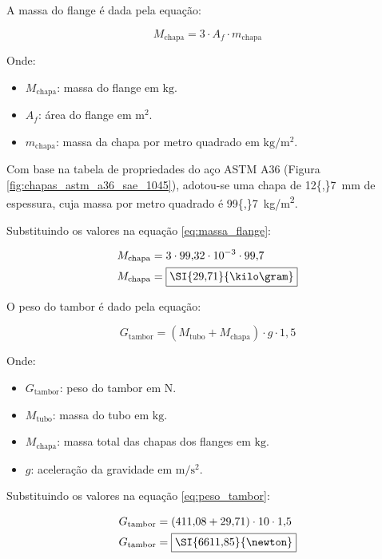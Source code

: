 A massa do flange é dada pela equação:

\begin{equation}
  M_{\text{chapa}} = 3 \cdot A_f \cdot m_{\text{chapa}}
  \label{eq:massa_flange}
\end{equation}

Onde:

\begin{itemize}[leftmargin=1.25cm]
  \item $M_{\text{chapa}}$: massa do flange em $\si{\kilo\gram}$.
  \item $A_f$: área do flange em $\si{\meter^2}$.
  \item $m_{\text{chapa}}$: massa da chapa por metro quadrado em $\si{\kilo\gram/\meter^2}$.
\end{itemize}

\vspace{1em}

Com base na tabela de propriedades do aço ASTM A36 (Figura \ref{fig:chapas_astm_a36_sae_1045}), adotou-se uma chapa de \SI{12{,}7}{\milli\meter} de espessura, cuja massa por metro quadrado é \SI{99{,}7}{\kilo\gram/\meter^2}.

Substituindo os valores na equação \eqref{eq:massa_flange}:

\begin{align*}
  M_{\text{chapa}} & = 3 \cdot 99{,}32 \cdot 10^{-3} \cdot 99{,}7 \\
  M_{\text{chapa}} & = \boxed{\SI{29{,}71}{\kilo\gram}}
\end{align*}

O peso do tambor é dado pela equação:

\begin{equation}
  G_{\text{tambor}} = \left(M_{\text{tubo}} + M_{\text{chapa}}\right) \cdot g \cdot 1{,}5
  \label{eq:peso_tambor}
\end{equation}

Onde:

\begin{itemize}[leftmargin=1.25cm]
  \item $G_{\text{tambor}}$: peso do tambor em $\si{\newton}$.
  \item $M_{\text{tubo}}$: massa do tubo em $\si{\kilo\gram}$.
  \item $M_{\text{chapa}}$: massa total das chapas dos flanges em $\si{\kilo\gram}$.
  \item $g$: aceleração da gravidade em $\si{\meter\per\second\squared}$.
\end{itemize}

\vspace{1em}

Substituindo os valores na equação \eqref{eq:peso_tambor}:

\begin{align*}
  G_{\text{tambor}} & = \left(411{,}08 + 29{,}71\right) \cdot 10 \cdot 1{,}5 \\
  G_{\text{tambor}} & = \boxed{\SI{6611{,}85}{\newton}}
\end{align*}
